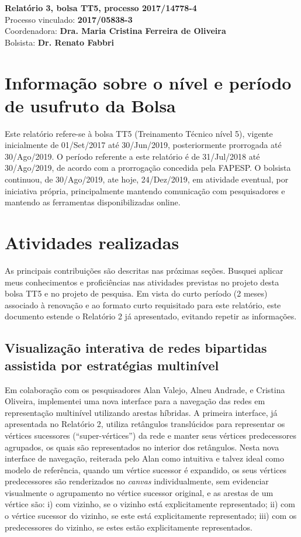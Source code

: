 \documentclass[a4paper, 11pt]{article}
\begin{document}
\noindent
\normalsize
 \textbf{Relatório 3, bolsa TT5, processo 2017/14778-4}\\
Processo vinculado: \textbf{2017/05838-3} \\
Coordenadora: \textbf{Dra. Maria Cristina Ferreira de Oliveira} \\
Bolsista: \textbf{Dr. Renato Fabbri}

\section{Informação sobre o nível e período de usufruto da Bolsa}
Este relatório refere-se à bolsa TT5 (Treinamento Técnico nível 5),
vigente inicialmente de 01/Set/2017 até 30/Jun/2019, posteriormente prorrogada até 30/Ago/2019.
O período referente a este relatório é de 31/Jul/2018 até 30/Ago/2019,
de acordo com a prorrogação concedida pela FAPESP.
O bolsista continuou, de 30/Ago/2019, ate hoje, 24/Dez/2019, em atividade eventual, 
por iniciativa própria, principalmente mantendo comunicação com pesquisadores e
mantendo as ferramentas disponibilizadas online.

\section{Atividades realizadas}\label{desc}
As principais contribuições são descritas nas próximas seções.
Busquei
aplicar meus conhecimentos e proficiências nas atividades previstas
no projeto desta bolsa TT5
e no projeto de pesquisa.
Em vista do curto período (2 meses) associado à renovação e ao formato curto
requisitado para este relatório, este documento estende o Relatório 2 já apresentado,
evitando repetir as informações.

\subsection{Visualização interativa de redes bipartidas assistida por estratégias multinível}\label{sml}
Em colaboração com os pesquisadores Alan Valejo, Alneu Andrade, e Cristina Oliveira,
implementei uma nova interface para a navegação das redes em representação multinível
utilizando arestas híbridas. A primeira interface, já apresentada no Relatório 2,
utiliza retângulos translúcidos para representar os vértices sucessores (``super-vértices'')
da rede e manter seus vértices predecessores agrupados, os quais são representados no interior dos retângulos.
Nesta nova interface de navegação, reiterada pelo Alan como intuitiva e talvez ideal como modelo de referência,
quando um vértice sucessor é expandido, os seus vértices predecessores são renderizados no
\emph{canvas} individualmente, sem
evidenciar visualmente o agrupamento no vértice sucessor original,
e as arestas de um vértice são:
i) com vizinho, se o vizinho está explicitamente representado;
ii) com o vértice sucessor do vizinho, se este está explicitamente representado;
iii) com os  predecessores do vizinho, se estes estão explicitamente representados.
\end{document}
